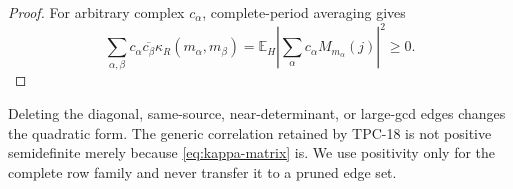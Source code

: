 \begin{proof}
For arbitrary complex \(c_\alpha\), complete-period averaging gives
\[
 \sum_{\alpha,\beta}c_\alpha\overline{c_\beta}
 \kappa_R(m_\alpha,m_\beta)
 =\mathbb E_H\left|
 \sum_\alpha c_\alpha M_{m_\alpha}(j)
 \right|^2\ge0.
\]
\end{proof}

\begin{remark}
Deleting the diagonal, same-source, near-determinant, or large-gcd
edges changes the quadratic form.  The generic correlation retained by
TPC-18 is not positive semidefinite merely because
\eqref{eq:kappa-matrix} is.  We use positivity only for the complete
row family and never transfer it to a pruned edge set.
\end{remark}
